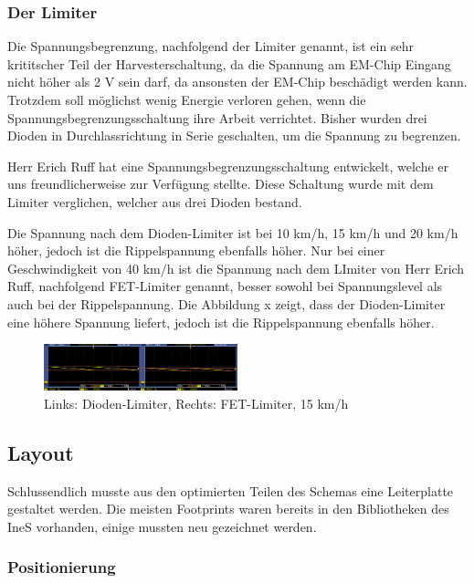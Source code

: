 \subsubsection{Der Limiter}

Die Spannungsbegrenzung, nachfolgend der Limiter genannt, ist ein sehr krititscher Teil der Harvesterschaltung, da die Spannung am EM-Chip Eingang nicht höher als 2 V sein darf, da ansonsten der EM-Chip beschädigt werden kann. Trotzdem soll möglichst wenig Energie verloren gehen, wenn die Spannungsbegrenzungsschaltung ihre Arbeit verrichtet. Bisher wurden drei Dioden in Durchlassrichtung in Serie geschalten, um die Spannung zu begrenzen.

Herr Erich Ruff hat eine Spannungsbegrenzungsschaltung entwickelt, welche er uns freundlicherweise zur Verfügung stellte. Diese Schaltung wurde mit dem Limiter verglichen, welcher aus drei Dioden bestand.

Die Spannung nach dem Dioden-Limiter ist bei 10 km/h, 15 km/h und 20 km/h höher, jedoch ist die Rippelspannung ebenfalls höher. Nur bei einer Geschwindigkeit von 40 km/h ist die Spannung nach dem LImiter von Herr Erich Ruff, nachfolgend FET-Limiter genannt, besser sowohl bei Spannungslevel als auch bei der Rippelspannung. Die Abbildung x zeigt, dass der Dioden-Limiter eine höhere Spannung liefert, jedoch ist die Rippelspannung ebenfalls höher.

\begin{figure}[ht]
    \includegraphics[width=0.5\textwidth]{3Vorgehen/imag/Messung_Optimierung_Limiter.png}
    \caption{Links: Dioden-Limiter, Rechts: FET-Limiter, 15 km/h}\label{messung_optimierung_limiter} 
\end{figure}

\subsection{Layout}

Schlussendlich musste aus den optimierten Teilen des Schemas eine Leiterplatte gestaltet werden. Die meisten Footprints waren bereits in den Bibliotheken des IneS vorhanden, einige mussten neu gezeichnet werden.

\subsubsection{Positionierung}

